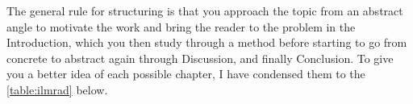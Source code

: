 The general rule for structuring is that you approach the topic from an abstract angle to motivate the work and bring the reader to the problem in the Introduction, which you then study through a method before starting to go from concrete to abstract again through Discussion, and finally Conclusion.
To give you a better idea of each possible chapter, I have condensed them to the \autoref{table:ilmrad} below.

